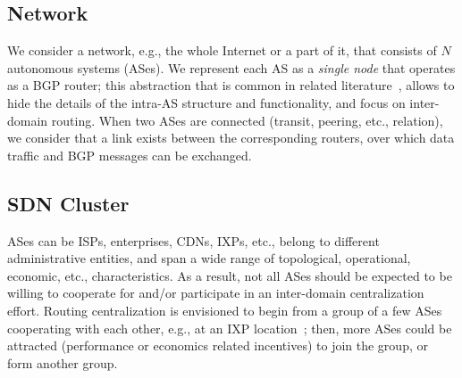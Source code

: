 \subsection{Network}
We consider a network, e.g., the whole Internet or a part of it, that consists of $N$ autonomous systems (ASes). We represent each AS as a \textit{single node} that operates as a BGP router; this abstraction that is common in related literature~\cite{Labozitz-Delayed-convergence-CCR-2000,Kotronis-Routing-Centralization-ComNets-2015}, allows to hide the details of the intra-AS structure and functionality, and focus on inter-domain routing. When two ASes are connected (transit, peering, etc., relation), we consider that a link exists between the corresponding routers, over which data traffic and BGP messages can be exchanged. %




\subsection{SDN Cluster}

ASes can be ISPs, enterprises, CDNs, IXPs, etc., belong to different administrative entities, and span a wide range of topological, operational, economic, etc., characteristics. As a result, not all ASes should be expected to be willing to cooperate for and/or participate in an inter-domain centralization effort. Routing centralization is envisioned to begin from a group of a few ASes cooperating with each other, e.g., at an IXP location~\cite{Gupta-SDX-CCR-2014,Kotronis-CXP-SOSR-2016}; then, more ASes could be attracted (performance or economics related incentives) to join the group, or form another group.

